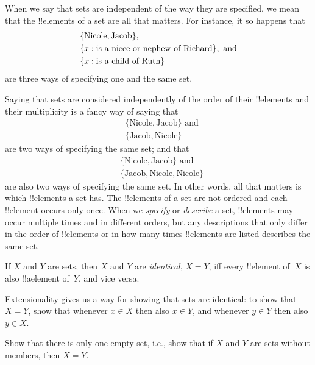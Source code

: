 \documentclass[../../../include/open-logic-section]{subfiles}
\begin{document}
\begin{explain}
When we say that sets are independent of the way they are specified,
we mean that the !!{element}s of a set are all that matters. For instance,
it so happens that
\begin{align*}
  & \{\text{Nicole}, \text{Jacob}\},\\
  & \Setabs{x}{\text{is a niece or nephew of Richard}}, \text{ and}\\
  & \Setabs{x}{\text{is a child of Ruth}}
\end{align*}
are three ways of specifying one and the same set.

Saying that sets are considered independently of the order of their
!!{element}s and their multiplicity is a fancy way of saying that
\begin{align*}
  & \{\text{Nicole}, \text{Jacob}\} \text{ and}\\
  & \{\text{Jacob}, \text{Nicole}\}
\end{align*}
are two ways of specifying the same set; and that
\begin{align*}
  & \{\text{Nicole}, \text{Jacob}\} \text{ and}\\
  & \{\text{Jacob}, \text{Nicole}, \text{Nicole}\}
\end{align*}
are also two ways of specifying the same set.  In other words, all
that matters is which !!{element}s a set has. The !!{element}s of a
set are not ordered and each !!{element} occurs only once. When we
\emph{specify} or \emph{describe} a set, !!{element}s may occur
multiple times and in different orders, but any descriptions that only
differ in the order of !!{element}s or in how many times !!{element}s
are listed describes the same set.
\end{explain}

\begin{defn}[Extensionality]
  If $X$ and $Y$ are sets, then $X$ and $Y$ are \emph{identical}, $X =
  Y$, iff every !!{element} of~$X$ is also !!a{element} of~$Y$, and
  vice versa.
\end{defn}

\begin{explain}
Extensionality gives us a way for showing that sets are identical: to
show that $X = Y$, show that whenever $x \in X$ then also $x \in Y$,
and whenever $y \in Y$ then also $y \in X$.
\end{explain}

\begin{prob}
Show that there is only one empty set, i.e., show that if $X$ and $Y$
are sets without members, then $X = Y$.
\end{prob}
\end{document}
